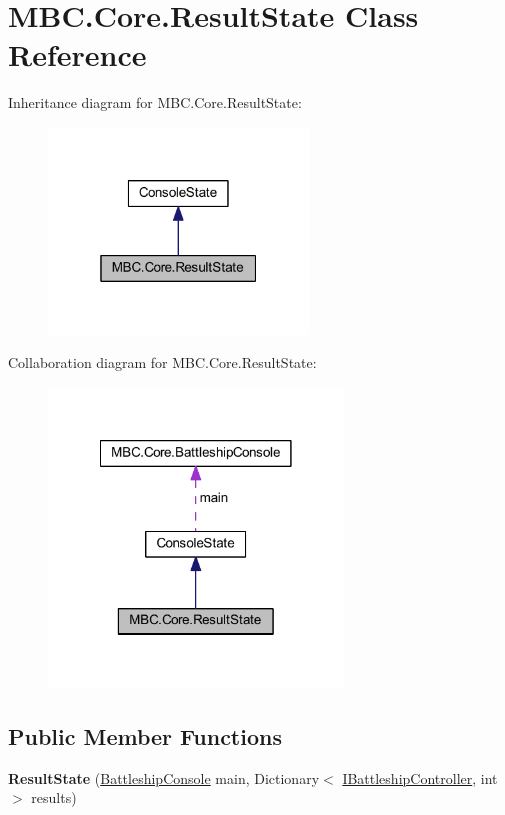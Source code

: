 \hypertarget{class_m_b_c_1_1_core_1_1_result_state}{\section{M\-B\-C.\-Core.\-Result\-State Class Reference}
\label{class_m_b_c_1_1_core_1_1_result_state}
}


Inheritance diagram for M\-B\-C.\-Core.\-Result\-State\-:\nopagebreak
\begin{figure}[H]
\begin{center}
\leavevmode
\includegraphics[width=196pt]{class_m_b_c_1_1_core_1_1_result_state__inherit__graph}
\end{center}
\end{figure}


Collaboration diagram for M\-B\-C.\-Core.\-Result\-State\-:\nopagebreak
\begin{figure}[H]
\begin{center}
\leavevmode
\includegraphics[width=222pt]{class_m_b_c_1_1_core_1_1_result_state__coll__graph}
\end{center}
\end{figure}
\subsection*{Public Member Functions}
\begin{DoxyCompactItemize}
\item 
\hypertarget{class_m_b_c_1_1_core_1_1_result_state_a0b5a5e9476f0fc703918e5ba4081f07b}{{\bfseries Result\-State} (\hyperlink{class_m_b_c_1_1_core_1_1_battleship_console}{Battleship\-Console} main, Dictionary$<$ \hyperlink{interface_m_b_c_1_1_core_1_1_i_battleship_controller}{I\-Battleship\-Controller}, int $>$ results)}\label{class_m_b_c_1_1_core_1_1_result_state_a0b5a5e9476f0fc703918e5ba4081f07b}

\end{DoxyCompactItemize}

